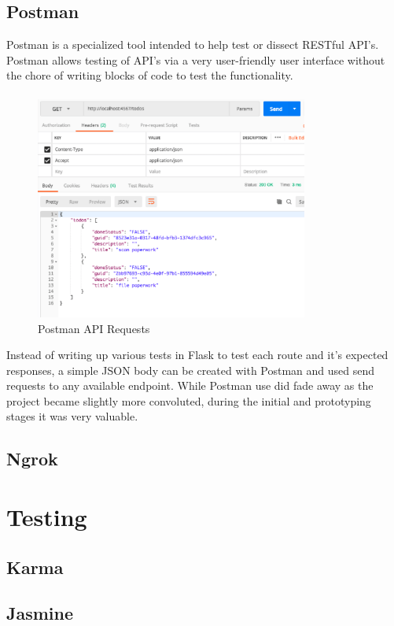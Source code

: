 \subsection{Postman}
Postman is a specialized tool intended to help test or dissect RESTful API's. Postman allows testing of API's via a very user-friendly user interface without the chore of writing blocks of code to test the functionality.

\paragraph{}

\begin{figure}[H]
	\caption{Postman API Requests}
	\label{image:postman}
	\centering
	\includegraphics[width=0.8\textwidth]{images/postman.png}
\end{figure}	

Instead of writing up various tests in Flask to test each route and it's expected responses, a simple JSON body can be created with Postman and used send requests to any available endpoint. While Postman use did fade away as the project became slightly more convoluted, during the initial and prototyping stages it was very valuable.

\subsection{Ngrok}

\section{Testing}
\subsection{Karma}
\subsection{Jasmine}
